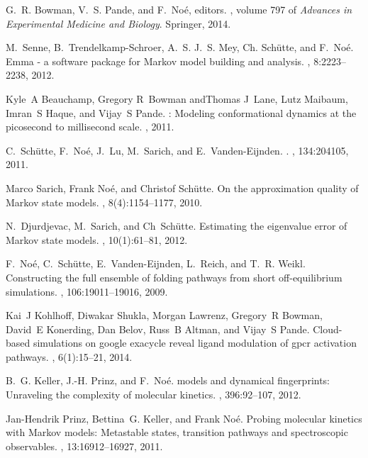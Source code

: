 \documentclass[journal=jctcce,manuscript=article]{achemso}
\begin{document}
\begin{thebibliography}{10}
G.~R. Bowman, V.~S. Pande, and F.~No\'e, editors.
, volume 797 of {\em Advances in
  Experimental Medicine and Biology}.
\newblock Springer, 2014.

M.~Senne, B.~Trendelkamp-Schroer, A.~S. J.~S. Mey, Ch. Sch\"utte, and F.~No\'e.
\newblock Emma - a software package for {{Markov}} model building and analysis.
, 8:2223--2238, 2012.

Kyle~A Beauchamp, Gregory R~Bowman andThomas J~Lane, Lutz Maibaum, Imran~S
  Haque, and Vijay~S Pande.
: {M}odeling conformational dynamics at the picosecond
  to millisecond scale.
, 2011.

C.~Sch{\"u}tte, F.~No{\'e}, J.~Lu, M.~Sarich, and E.~Vanden-Eijnden.
.
, 134:204105, 2011.

Marco Sarich, Frank No{\'e}, and Christof Sch{\"u}tte.
\newblock On the approximation quality of {Markov} state models.
, 8(4):1154--1177, 2010.

N.~Djurdjevac, M.~Sarich, and Ch~Sch{\"u}tte.
\newblock Estimating the eigenvalue error of {M}arkov state models.
, 10(1):61--81, 2012.

F.~No\'{e}, C.~Sch\"utte, E.~Vanden-Eijnden, L.~Reich, and T.~R. Weikl.
\newblock Constructing the full ensemble of folding pathways from short
  off-equilibrium simulations.
, 106:19011--19016, 2009.

Kai~J Kohlhoff, Diwakar Shukla, Morgan Lawrenz, Gregory~R Bowman, David~E
  Konerding, Dan Belov, Russ~B Altman, and Vijay~S Pande.
\newblock Cloud-based simulations on google exacycle reveal ligand modulation
  of gpcr activation pathways.
, 6(1):15--21, 2014.

B.~G. Keller, J.-H. Prinz, and F.~No\'e.
 models and dynamical fingerprints: {U}nraveling the
  complexity of molecular kinetics.
, 396:92--107, 2012.

Jan-Hendrik Prinz, Bettina~G. Keller, and Frank No{\'e}.
\newblock Probing molecular kinetics with {{{Markov}}} models: Metastable
  states, transition pathways and spectroscopic observables.
, 13:16912--16927, 2011.


\end{thebibliography}
\end{document}
